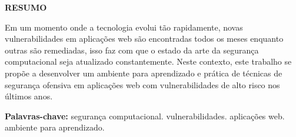 \begin{center}
    \textbf{RESUMO}
\end{center}

\noindent
Em um momento onde a tecnologia evolui tão rapidamente, novas vulnerabilidades em aplicações web são encontradas todos os meses enquanto outras são remediadas, isso faz com que o estado da arte da segurança computacional seja atualizado constantemente. Neste contexto, este trabalho se propõe a desenvolver um ambiente para aprendizado e prática de técnicas de segurança ofensiva em aplicações web com vulnerabilidades de alto risco nos últimos anos.

\noindent
\textbf{Palavras-chave:} segurança computacional. vulnerabilidades. aplicações web. ambiente para aprendizado.